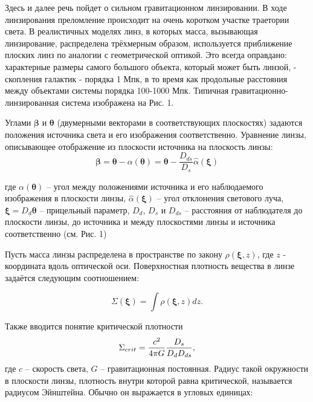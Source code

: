 \documentclass[12pt,a4paper]{article}
\begin{document}
\vspace{1em}
Здесь и далее речь пойдет о сильном гравитационном линзировании. 
В ходе линзирования преломление происходит на очень коротком участке траетории света. 
В реалистичных моделях линз, в которых масса, вызывающая линзирование, распределена трёхмерным образом, используется приближение плоских линз по аналогии с геометрической оптикой. 
Это всегда оправдано: характерные размеры самого большого объекта, который может быть линзой, - скопления галактик - порядка 1 Мпк, в то время как продольные расстояния между объектами системы порядка 100-1000 Мпк. 
Типичная гравитационно-линзированная система изображена на Рис. 1.

Углами $\bm{\beta}$ и $\bm{\theta}$ (двумерными векторами в соответствующих плоскостях) задаются положения источника света и его изображения соответственно. 
Уравнение линзы, описывающее отображение из плоскости источника на плоскость линзы:
\newline
\begin{equation}
    \bm \beta = \bm \theta - \alpha(\bm \theta) = \bm \theta - \frac{D_{ds}}{D_s} \widehat{\alpha}(\bm \xi)
\end{equation}

где $\alpha(\bm \theta)$ -- угол между положениями источника и его наблюдаемого изображения в плоскости линзы, $\widehat{\alpha}(\bm \xi)$ -- угол отклонения светового луча, $\bm \xi = D_d \bm \theta$ -- прицельный параметр, $D_d$, $D_s$ и $D_{ds}$ -- расстояния от наблюдателя до плоскости линзы, до источника и между плоскостями линзы и источника соответственно (см. Рис. 1)

Пусть масса линзы распределена в пространстве по закону $\rho(\bm \xi, z)$, где $z$ - координата вдоль оптической оси. 
Поверхностная плотность вещества в линзе задаётся следующим соотношением:

\begin{equation}
    \Sigma(\bm \xi) = \int \rho(\bm \xi, z) dz.
\end{equation}

Также вводится понятие критической плотности 
\begin{equation}
    \Sigma_{crit} = {c^2 \over 4 \pi G} {D_s \over D_d D_{ds}},
\end{equation}
где $c$ -- скорость света, $G$ -- гравитационная постоянная.
Радиус такой окружности в плоскости линзы, плотность внутри которой равна критической, называется радиусом Эйнштейна. 
Обычно он выражается в угловых единицах:
\end{document}
